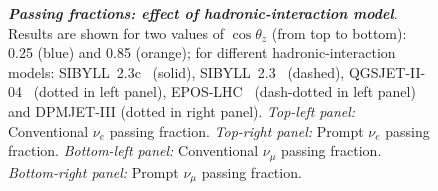 \documentclass[aps,prd,showpacs,letterpaper,onecolumn,longbibliography,superscriptaddress,notitlepage,nofootinbib]{revtex4-1}%
\begin{document}
\begin{figure}[h!]
{    }    
\caption{\textbf{\textit{Passing fractions: effect of hadronic-interaction model}}. Results are shown for two values of $\cos\theta_z$ (from top to bottom): 0.25 (blue) and 0.85 (orange); for different hadronic-interaction models: SIBYLL~2.3c~\cite{Riehn:2017mfm} (solid), SIBYLL~2.3~\cite{Engel:2015dxa, Riehn:2015oba} (dashed), QGSJET-II-04~\cite{Ostapchenko:2010vb} (dotted in left panel), EPOS-LHC~\cite{Pierog:2013ria} (dash-dotted in left panel) and DPMJET-III\cite{Roesler:2000he} (dotted in right panel).
\textit{Top-left panel:} Conventional $\nu_e$ passing fraction. \textit{Top-right panel:} Prompt $\nu_e$ passing fraction. \textit{Bottom-left panel:} Conventional $\nu_\mu$ passing fraction. \textit{Bottom-right panel:} Prompt $\nu_\mu$ passing fraction.} \vspace{1cm}
\label{fig:nue-hadronic-model-effect}
\end{figure}
\end{document}
